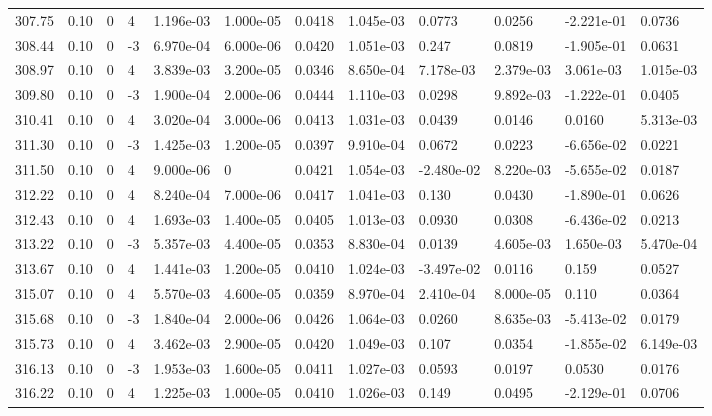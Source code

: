 \documentclass[preview]{standalone}
\begin{document}
{{{{{{{{{{{{{{{\begin{tabular}{L{1.2cm}C{1.2cm} C{0.3cm}C{0.5cm} C{1.4cm}C{1.4cm} C{1.4cm}C{1.4cm} C{1.6cm}C{1.6cm} C{1.6cm}C{1.6cm}}
  307.75  &  0.10  & 0     &  4 &  1.196e-03  & 1.000e-05  &  0.0418&   1.045e-03& 0.0773 & 0.0256   &  -2.221e-01 & 0.0736  \\ 
  308.44  &  0.10  & 0     & -3 &  6.970e-04  & 6.000e-06  &  0.0420&   1.051e-03& 0.247 & 0.0819   &  -1.905e-01 & 0.0631  \\ 
  308.97  &  0.10  & 0     &  4 &  3.839e-03  & 3.200e-05  &  0.0346&   8.650e-04& 7.178e-03 & 2.379e-03   &  3.061e-03 & 1.015e-03  \\ 
  309.80  &  0.10  & 0     & -3 &  1.900e-04  & 2.000e-06  &  0.0444&   1.110e-03& 0.0298 & 9.892e-03   &  -1.222e-01 & 0.0405  \\ 
  310.41  &  0.10  & 0     &  4 &  3.020e-04  & 3.000e-06  &  0.0413&   1.031e-03& 0.0439 & 0.0146   &  0.0160 & 5.313e-03  \\ 
  311.30  &  0.10  & 0     & -3 &  1.425e-03  & 1.200e-05  &  0.0397&   9.910e-04& 0.0672 & 0.0223   &  -6.656e-02 & 0.0221  \\ 
  311.50  &  0.10  & 0     &  4 &  9.000e-06  & 0  &  0.0421&   1.054e-03& -2.480e-02 & 8.220e-03   &  -5.655e-02 & 0.0187  \\ 
  312.22  &  0.10  & 0     &  4 &  8.240e-04  & 7.000e-06  &  0.0417&   1.041e-03& 0.130 & 0.0430   &  -1.890e-01 & 0.0626  \\ 
  312.43  &  0.10  & 0     &  4 &  1.693e-03  & 1.400e-05  &  0.0405&   1.013e-03& 0.0930 & 0.0308   &  -6.436e-02 & 0.0213  \\ 
  313.22  &  0.10  & 0     & -3 &  5.357e-03  & 4.400e-05  &  0.0353&   8.830e-04& 0.0139 & 4.605e-03   &  1.650e-03 & 5.470e-04  \\ 
  313.67  &  0.10  & 0     &  4 &  1.441e-03  & 1.200e-05  &  0.0410&   1.024e-03& -3.497e-02 & 0.0116   &  0.159 & 0.0527  \\ 
  315.07  &  0.10  & 0     &  4 &  5.570e-03  & 4.600e-05  &  0.0359&   8.970e-04& 2.410e-04 & 8.000e-05   &  0.110 & 0.0364  \\ 
  315.68  &  0.10  & 0     & -3 &  1.840e-04  & 2.000e-06  &  0.0426&   1.064e-03& 0.0260 & 8.635e-03   &  -5.413e-02 & 0.0179  \\ 
  315.73  &  0.10  & 0     &  4 &  3.462e-03  & 2.900e-05  &  0.0420&   1.049e-03& 0.107 & 0.0354   &  -1.855e-02 & 6.149e-03  \\ 
  316.13  &  0.10  & 0     & -3 &  1.953e-03  & 1.600e-05  &  0.0411&   1.027e-03& 0.0593 & 0.0197   &  0.0530 & 0.0176  \\ 
  316.22  &  0.10  & 0     &  4 &  1.225e-03  & 1.000e-05  &  0.0410&   1.026e-03& 0.149 & 0.0495   &  -2.129e-01 & 0.0706  \\ 

\end{tabular}}}}}}}}}}}}}}}}
\end{document}
